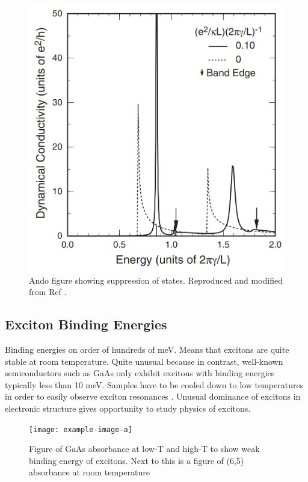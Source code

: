 \begin{figure}[h]
	\centering
	\includegraphics[scale=0.4]{images/chapter_optical_props/ando_suppression}
	\caption{Ando figure showing suppression of states. Reproduced and modified from Ref \cite{ando2005theory}.}
	\label{fig:ando_suppression}
\end{figure}

\subsection{Exciton Binding Energies}


Binding energies on order of hundreds of meV. Means that excitons are quite stable at room temperature. Quite unusual because in contrast, well-known semiconductors such as GaAs only exhibit excitons with binding energies typically less than 10 meV. Samples have to be cooled down to low temperatures in order to easily observe exciton resonances \cite{liang1970excitons}. Unusual dominance of excitons in electronic structure gives opportunity to study physics of excitons.




\begin{figure}[h]
	\centering
	\texttt{[image: example-image-a]}
	\caption{Figure of GaAs absorbance at low-T and high-T to show weak binding energy of excitons. Next to this is a figure of  (6,5) absorbance at room temperature}
	\label{fig:gaas_vs_cnt_absorbance}
\end{figure}


